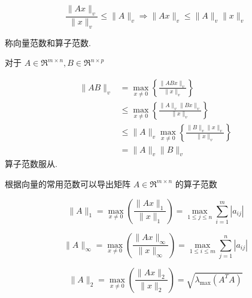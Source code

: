 \begin{definition}[向量范数和算子范数相容]
    \begin{equation} \frac{\|A x\|_{v}}{\|x\|_{v}} \leq\|A\|_{v} \Rightarrow\|A x\|_{v} \leq\|A\|_{v}\|x\|_{v} \end{equation}

    称向量范数和算子范数. 
\end{definition}

\begin{theorem}[算子范数服从乘法范数相容性]
   对于 $ A \in \mathfrak{R}^{m \times n}, B \in \mathfrak{R}^{n \times p} $

    \begin{equation}\begin{aligned}
        \|A B\|_{v} &=\max _{x \neq 0}\left\{\frac{\|A B x\|_{v}}{\|x\|_{v}}\right\} \\
        & \leq \max _{x \neq 0}\left\{\frac{\|A\|_{v}\|B x\|_{v}}{\|x\|_{v}}\right\} \\
        & \leq\|A\|_{v} \max _{x \neq 0}\left\{\frac{\|B\|_{v}\|x\|_{v}}{\|x\|_{v}}\right\} \\
        & =\|A\|_{v}\|B\|_{v}
    \end{aligned}\end{equation}
    算子范数服从.
\end{theorem}

根据向量的常用范数可以导出矩阵 $ A \in \mathfrak{R}^{m \times n} $ 的算子范数

\begin{definition}[$A$的列范数]
    \begin{equation} \|A\|_{1}=\max _{x \neq 0}\left(\frac{\|A x\|_{1}}{\|x\|_{1}}\right)=\max _{1 \leq j \leq n} \sum_{i=1}^{m}\left|a_{i j}\right| \end{equation}
\end{definition}

\begin{definition}[$A$的行范数]
    \begin{equation} \|A\|_{\infty}=\max _{x \neq 0}\left( \frac{\|A x\|_{\infty}}{\|x\|_{\infty}}    \right)=\max _{1 \leq i \leq m} \sum_{j=1}^{n}\left|a_{i j}\right| \end{equation}
\end{definition}

\begin{definition}[$A$的2-范数]
    \begin{equation}
        \label{eqn:a-l2-norm}
        \|A\|_{2}=\max _{x \neq 0}\left( \frac{\|A x\|_{2}}{\|x\|_{2}}  \right)=\sqrt{\lambda_{\max }\left(A^{T} A\right)}
    \end{equation}
    \begin{equation}  \end{equation}
\end{definition}

